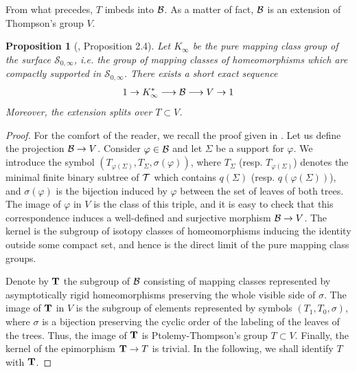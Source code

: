 \documentclass[twoside]{irmaems}
\theoremstyle{plain}
\newtheorem{proposition}[theorem]{Proposition}
\theoremstyle{definition}
\theoremstyle{remark}
\newcommand{\B}{{{\cal B}}}
\newcommand{\s}{{\sigma}}
\begin{document}
\vspace{0.1cm}\noindent 
From what precedes, $T$ imbeds into  $\B$. As a matter of fact, $\B$ is an extension of Thompson's group $V$.
 
\begin{proposition} [\cite{fu-ka1}, Proposition 2.4]
Let $K_{\infty}$ be the pure mapping class group of the surface $\mathscr{S}_{0,\infty}$, i.e. the group of mapping classes of  homeomorphisms 
which are compactly supported in $\mathscr{S}_{0,\infty}$. There exists a short exact sequence 
$$1\rightarrow K^*_{\infty}\longrightarrow \B \longrightarrow V\rightarrow 1$$
Moreover, the extension splits over  $T\subset V$.
 \end{proposition}

\begin{proof} For the comfort of the reader, we recall the proof given in \cite{fu-ka1}.  Let us define the projection $\B \to V$.          
Consider $\varphi\in \B$ and let $\Sigma$ be a support for         
$\varphi$. We introduce the         
  symbol         
  $(T_{\varphi(\Sigma)},T_{\Sigma},\sigma(\varphi))$, where  
$T_{\Sigma}$ (resp. $T_{\varphi(\Sigma)}$) denotes the minimal finite binary subtree of ${\cal T}$ which contains ${q}(\Sigma)$ (resp. ${q}(\varphi(\Sigma))$), and $\sigma(\varphi)$ is the bijection induced by $\varphi$ between the set of leaves of both trees. The image of $\varphi$ in $V$ is the          
class of this triple, and it is easy to check that this correspondence induces         
a well-defined and surjective morphism $\B\rightarrow V$. The kernel is the subgroup of         
isotopy classes of homeomorphisms inducing the identity outside  some  
compact set, 
and hence is the direct limit of the pure mapping class groups. 
 
\vspace{0.1cm}  
\noindent        
Denote by ${\bf T}$ the subgroup of $\B$ consisting of mapping classes         
represented by asymptotically rigid homeomorphisms preserving the whole visible         
side  of $\s$. The image of ${\bf T}$ in $V$ is the subgroup of elements         
represented by symbols $(T_1,T_0,\sigma)$, where $\sigma$ is a bijection preserving the cyclic order of the labeling of the leaves of the 
trees. Thus, the image of ${\bf T}$ is Ptolemy-Thompson's group  
$T\subset V$. Finally, the kernel of the epimorphism ${\bf T}\to T$ is         
trivial. In the following, we shall identify $T$ with ${\bf T}$.      
\end{proof}
\end{document}

